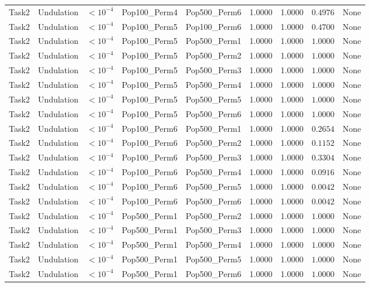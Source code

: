 \documentclass[8pt]{article}
\begin{document}
\begin{longtable}{llccccccc}
Task2 & Undulation & $< 10^{-4}$ & Pop100\_Perm4 & Pop500\_Perm6 & 1.0000 & 1.0000 & $0.4976$ & None \\
Task2 & Undulation & $< 10^{-4}$ & Pop100\_Perm5 & Pop100\_Perm6 & 1.0000 & 1.0000 & $0.4700$ & None \\
Task2 & Undulation & $< 10^{-4}$ & Pop100\_Perm5 & Pop500\_Perm1 & 1.0000 & 1.0000 & $1.0000$ & None \\
Task2 & Undulation & $< 10^{-4}$ & Pop100\_Perm5 & Pop500\_Perm2 & 1.0000 & 1.0000 & $1.0000$ & None \\
Task2 & Undulation & $< 10^{-4}$ & Pop100\_Perm5 & Pop500\_Perm3 & 1.0000 & 1.0000 & $1.0000$ & None \\
Task2 & Undulation & $< 10^{-4}$ & Pop100\_Perm5 & Pop500\_Perm4 & 1.0000 & 1.0000 & $1.0000$ & None \\
Task2 & Undulation & $< 10^{-4}$ & Pop100\_Perm5 & Pop500\_Perm5 & 1.0000 & 1.0000 & $1.0000$ & None \\
Task2 & Undulation & $< 10^{-4}$ & Pop100\_Perm5 & Pop500\_Perm6 & 1.0000 & 1.0000 & $1.0000$ & None \\
Task2 & Undulation & $< 10^{-4}$ & Pop100\_Perm6 & Pop500\_Perm1 & 1.0000 & 1.0000 & $0.2654$ & None \\
Task2 & Undulation & $< 10^{-4}$ & Pop100\_Perm6 & Pop500\_Perm2 & 1.0000 & 1.0000 & $0.1152$ & None \\
Task2 & Undulation & $< 10^{-4}$ & Pop100\_Perm6 & Pop500\_Perm3 & 1.0000 & 1.0000 & $0.3304$ & None \\
Task2 & Undulation & $< 10^{-4}$ & Pop100\_Perm6 & Pop500\_Perm4 & 1.0000 & 1.0000 & $0.0916$ & None \\
Task2 & Undulation & $< 10^{-4}$ & Pop100\_Perm6 & Pop500\_Perm5 & 1.0000 & 1.0000 & $0.0042$ & None \\
Task2 & Undulation & $< 10^{-4}$ & Pop100\_Perm6 & Pop500\_Perm6 & 1.0000 & 1.0000 & $0.0042$ & None \\
Task2 & Undulation & $< 10^{-4}$ & Pop500\_Perm1 & Pop500\_Perm2 & 1.0000 & 1.0000 & $1.0000$ & None \\
Task2 & Undulation & $< 10^{-4}$ & Pop500\_Perm1 & Pop500\_Perm3 & 1.0000 & 1.0000 & $1.0000$ & None \\
Task2 & Undulation & $< 10^{-4}$ & Pop500\_Perm1 & Pop500\_Perm4 & 1.0000 & 1.0000 & $1.0000$ & None \\
Task2 & Undulation & $< 10^{-4}$ & Pop500\_Perm1 & Pop500\_Perm5 & 1.0000 & 1.0000 & $1.0000$ & None \\
Task2 & Undulation & $< 10^{-4}$ & Pop500\_Perm1 & Pop500\_Perm6 & 1.0000 & 1.0000 & $1.0000$ & None \\

\end{longtable}
\end{document}
